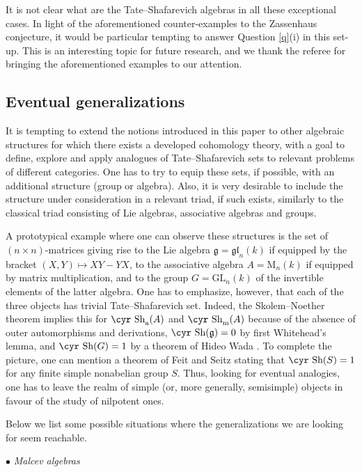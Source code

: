 \documentclass[11pt,reqno]{amsart}
\numberwithin{equation}{section}
\theoremstyle{definition}
\def\Sha{\text{\cyr Sh}}
\def\g{\mathfrak g}
\begin{document}
It is not clear what are the Tate--Shafarevich algebras in all these exceptional cases.
In light of the aforementioned counter-examples to the Zassenhaus conjecture, it would
be particular tempting to answer Question \ref{q}(i) in this set-up.
This is an interesting topic for future research, and we thank the referee for bringing
the aforementioned examples to our attention.

\subsection{Eventual generalizations} It is tempting to extend the notions introduced in this paper
to other algebraic structures for which there exists a developed cohomology theory, with a goal to
define, explore and apply analogues of Tate--Shafarevich sets to relevant problems of
different categories. One has to try to equip these sets, if possible, with an additional structure (group
or algebra). Also, it is very desirable to include the structure under consideration in a relevant triad,
if such exists, similarly to the classical triad consisting of Lie algebras, associative algebras and groups.

A prototypical example where one can observe these structures is the set of $(n\times n)$-matrices
giving rise to the Lie algebra $\g=\mathfrak{gl}_n(k)$ if equipped by the bracket $(X,Y)\mapsto XY-YX$, to the
associative algebra $A={\mathrm M}_n(k)$ if equipped by matrix multiplication, and to the group $G={\mathrm{GL}}_n(k)$
of the invertible elements of the latter algebra. One has to emphasize, however, that each of the three objects has
trivial Tate--Shafarevich set. Indeed, the Skolem--Noether theorem implies this for $\Sha_{\textrm{a}}(A)$ and $\Sha_{\textrm{m}}(A)$
because of the absence of outer automorphisms and derivations, $\Sha(\g)=0$ by first Whitehead's lemma, and $\Sha(G)=1$
by a theorem of Hideo Wada \cite{Wa}. To complete the picture, one can mention a theorem of Feit and Seitz
\cite{FS} stating that $\Sha(S)=1$ for any finite simple nonabelian group $S$. Thus, looking for eventual analogies, one
has to leave the realm of simple (or, more generally, semisimple) objects in favour of the study of nilpotent ones.

Below we list some possible situations where the generalizations we are looking for seem reachable.

\medskip

$\bullet$ {\it Malcev algebras}
\end{document}
